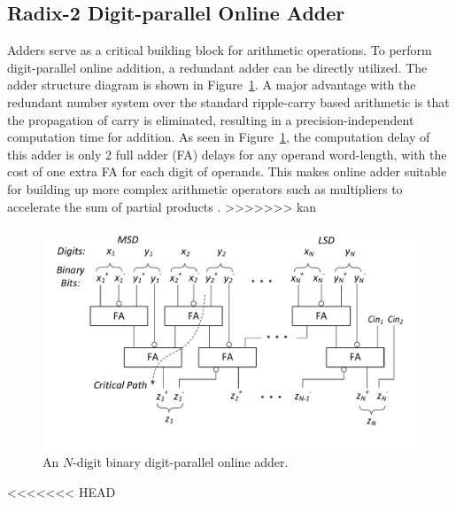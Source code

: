 \documentclass{acm_proc_article-sp}
\begin{document}
\subsection{Radix-2 Digit-parallel Online Adder}\label{subsec:OnlineAdder}
Adders serve as a critical building block for arithmetic operations. To perform digit-parallel online addition, a redundant adder can be directly utilized. The adder structure diagram is shown in Figure~\ref{Fig:Radix2SD_adder}. A major advantage with the redundant number system over the standard ripple-carry based arithmetic is that the propagation of carry is eliminated, resulting in a precision-independent computation time for addition. As seen in Figure~\ref{Fig:Radix2SD_adder}, the computation delay of this adder is only 2 full adder (FA) delays for any operand word-length, with the cost of one extra FA for each digit of operands. This makes online adder suitable for building up more complex arithmetic operators such as multipliers to accelerate the sum of partial products \cite{RedundantMult_1987,RedundantMult_1985}.
%
>>>>>>> kan
%
\begin{figure}
\includegraphics[width=.5\textwidth]{./Figures/SDAdder.pdf}
\vspace{-8.5ex}
\caption{An $N$-digit binary digit-parallel online adder.}
\label{Fig:Radix2SD_adder}
\end{figure}

<<<<<<< HEAD
\end{document}
